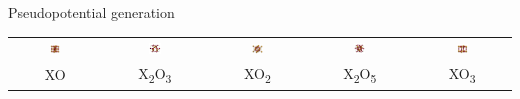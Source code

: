 \documentclass[xcolor=table,aspectratio=169]{beamer}
\numberwithin{equation}{section}
\begin{document}
\begin{frame}{Pseudopotential generation}
{\begin{center}
\begin{tabular}{ccccc}
         \includegraphics[width=0.125\textwidth]{figures/sssp_structures/P-XO-conv_cell.png} &
         \includegraphics[width=0.125\textwidth]{figures/sssp_structures/P-X2O3-conv_cell.png} &
         \includegraphics[width=0.125\textwidth]{figures/sssp_structures/P-XO2-conv_cell.png} &
         \includegraphics[width=0.125\textwidth]{figures/sssp_structures/P-X2O5-conv_cell.png} &
         \includegraphics[width=0.125\textwidth]{figures/sssp_structures/P-XO3-conv_cell.png} \\
         XO & X\textsubscript{2}O\textsubscript{3} & XO\textsubscript{2} & X\textsubscript{2}O\textsubscript{5} & XO\textsubscript{3}
      \end{tabular}
   \end{center}
   }
\end{frame}
\end{document}
